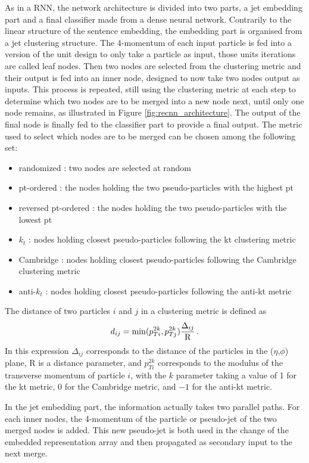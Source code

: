 As in a RNN, the network architecture is divided into two parts, a jet embedding part and a final classifier made from a dense neural network. Contrarily to the linear structure of the sentence embedding, the embedding part is organised from a jet clustering structure. The 4-momentum of each input particle is fed into a version of the unit design to only take a particle as input, those units iterations are called leaf nodes. Then two nodes are selected from the clustering metric and their output is fed into an inner node, designed to now take two nodes output as inputs. This process is repeated, still using the clustering metric at each step to determine which two nodes are to be merged into a new node next, until only one node remains, as illustrated in Figure \ref{fig:recnn_architecture}. The output of the final node is finally fed to the classifier part to provide a final output. 
The metric used to select which nodes are to be merged can be chosen among the following set:
    
\begin{itemize}
    \item randomized : two nodes are selected at random
    \item pt-ordered : the nodes holding the two pseudo-particles with the highest pt 
    \item reversed pt-ordered : the nodes holding the two pseudo-particles with the lowest pt
    \item $k_t$ : nodes holding closest pseudo-particles following the kt clustering metric
    \item Cambridge : nodes holding closest pseudo-particles following the Cambridge clustering metric
    \item anti-$k_t$ : nodes holding closest pseudo-particles following the anti-kt metric
\end{itemize}
The distance of two particles $i$ and $j$ in a clustering metric is defined as
\begin{equation}
    d_{ij} = \mathrm{min}(p_{Ti}^{2k},p_{Tj}^{2k}) \frac{\Delta_{ij}}{\mathrm{R}} \mend
\end{equation}
In this expression $\Delta_{ij}$ corresponds to the distance of the particles in the ($\eta$,$\phi$) plane, R is a distance parameter, and $p_{Ti}^{2k}$ corresponds to the modulus of the transverse momentum of particle $i$, with the $k$ parameter taking a value of 1 for the kt metric, 0 for the Cambridge metric, and $-1$ for the anti-kt metric.

In the jet embedding part, the information actually takes two parallel paths. For each inner nodes, the 4-momentum of the particle or pseudo-jet of the two merged nodes is added. This new pseudo-jet is both used in the change of the embedded representation array and then propagated as secondary input to the next merge.

